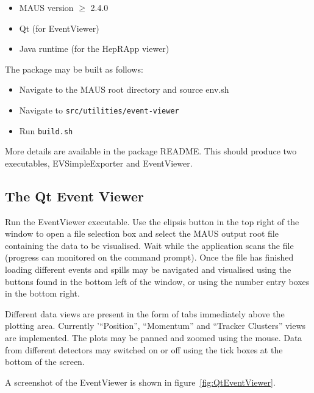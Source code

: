 \documentclass[a4paper,10pt]{article}
\begin{document}
\begin{itemize}
 \item MAUS version $\ge$ 2.4.0
 \item Qt (for EventViewer)
 \item Java runtime (for the HepRApp viewer)
\end{itemize}

The package may be built as follows:
\begin{itemize}
 \item Navigate to the MAUS root directory and source env.sh
 \item Navigate to \texttt{src/utilities/event-viewer}
 \item Run \texttt{build.sh}
\end{itemize}

More details are available in the package README. This should produce two executables, EVSimpleExporter and EventViewer.

\subsection{The Qt Event Viewer}
Run the EventViewer executable. Use the elipsis button in the top right of the window to open a file selection box and select the MAUS output root file containing the data to be visualised. Wait while the application scans the file (progress can monitored on the command prompt). Once the file has finished loading different events and spills may be navigated and visualised using the buttons found in the bottom left of the window, or using the number entry boxes in the bottom right. 

Different data views are present in the form of tabs immediately above the plotting area. Currently '``Position'', ``Momentum'' and ``Tracker Clusters'' views are implemented. The plots may be panned and zoomed using the mouse. Data from different detectors may switched on or off using the tick boxes at the bottom of the screen.

A screenshot of the EventViewer is shown in figure~\ref{fig:QtEventViewer}.
\end{document}
